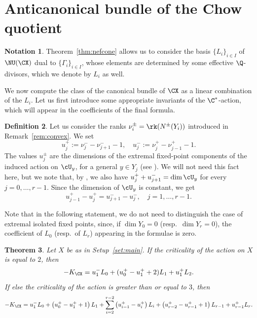 \documentclass[11pt]{amsart}
\numberwithin{equation}{section}
\newtheorem{theorem}{Theorem}[section]
\theoremstyle{definition}
\newtheorem{definition}[theorem]{Definition}
\newtheorem{notation}[theorem]{Notation}
\theoremstyle{remark}
\begin{document}

\section{Anticanonical bundle of the Chow quotient}\label{sec:antican}


\begin{notation}\label{not:dualbasis}
Theorem~\ref{thm:nefcone} allows us to consider the basis $\{L_i\}_{i\in I}$ of $\NU(\CX)$ dual to $\{\Gamma_i\}_{i\in I}$, whose elements are determined by some effective $\Q$-divisors, which we denote by $L_i$ as well. 
\end{notation}


We now compute the class of the canonical bundle of $\CX$ as a linear combination of the $L_i$. Let us first introduce some appropriate invariants of the $\C^*$-action, which will appear in the coefficients of the final formula.

\begin{definition}\label{def:us}
Let us consider the ranks $\nu^\pm_i=\rk(N^\pm(Y_i))$ introduced in Remark~\ref{rem:convex}. We set 
\begin{equation}\label{eq:ui}
u_j^+:= \nu^-_j-\nu^-_{j+1}-1, \quad
u_j^-:= \nu^+_j-\nu^+_{j-1}-1.
\end{equation}
The values $u_j^\pm$ are the dimensions of the extremal fixed-point components of the induced action on $\cU_y$, for a general $y \in Y_j$ (see \cite[Corollary 5.14]{OS2}). We will not need this fact here, but we note that, by \cite[Corollary 5.14]{OS2}, we also have $u_j^+ + u_{j+1}^-  = \dim \cU_y$  for every $j= 0, \dots, r-1$. Since the dimension of $\cU_y$ is constant, we get 
\begin{equation}\label{eq:u-+2}
 u_{j-1}^+-u_j^+ =  u_{j+1}^--u_j^-,\quad j= 1, \dots, r-1.
\end{equation}
\end{definition}

Note that in the following statement, we do not need to distinguish the case of extremal isolated fixed points, since, if $\dim Y_0 = 0$ (resp.\ $\dim Y_r=0$), the coefficient of $L_0$ (resp.\ of $L_r$) appearing in the formulae is zero. 

\begin{theorem}\label{thm:can} Let $X$ be as in Setup~\ref{set:main}. If  
the criticality of the action on $X$ is equal to $2$, then
\[
-K_{\CX}= u_1^-L_0+(u_0^+-u_1^++2)L_1 +u_1^+L_2.
\]
If else the criticality of the action is greater than or equal to $3$, then 
\[
-K_{\CX} =u_1^-L_0 +\left(u_{0}^+ - u_1^+ +1\right)L_1 + \sum_{i=2}^{r-2} \left( u_{i-1}^+-u_i^+\right)L_i +\left(u_{r-2}^+ - u_{r-1}^+ +1\right)L_{r-1}
+u_{r-1}^+L_r.
\]
\end{theorem}
\end{document}
